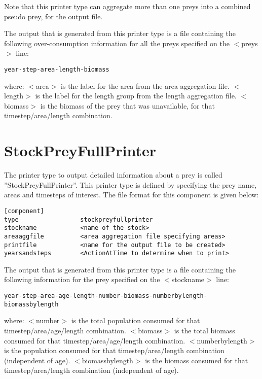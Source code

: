 \documentclass [a4paper, 10pt]{book}
\begin{document}
Note that this printer type can aggregate more than one preys into a combined pseudo prey, for the output file.

\bigskip
The output that is generated from this printer type is a file containing the following over-consumption information for all the preys specified on the $<$preys$>$ line:

{\small\begin{verbatim}
year-step-area-length-biomass
\end{verbatim}}

where:\newline
$<$area$>$ is the label for the area from the area aggregation file.\newline
$<$length$>$ is the label for the length group from the length aggregation file.\newline
$<$biomass$>$ is the biomass of the prey that was unavailable, for that timestep/area/length combination.

\section{StockPreyFullPrinter}\label{sec:stockpreyfullprinter}
The printer type to output detailed information about a prey is called ''StockPreyFullPrinter''.  This printer type is defined by specifying the prey name, areas and timesteps of interest.  The file format for this component is given below:

{\small\begin{verbatim}
[component]
type                 stockpreyfullprinter
stockname            <name of the stock>
areaaggfile          <area aggregation file specifying areas>
printfile            <name for the output file to be created>
yearsandsteps        <ActionAtTime to determine when to print>
\end{verbatim}}

The output that is generated from this printer type is a file containing the following information for the prey specified on the $<$stockname$>$ line:

{\small\begin{verbatim}
year-step-area-age-length-number-biomass-numberbylength-biomassbylength
\end{verbatim}}

where:\newline
$<$number$>$ is the total population consumed for that timestep/area/age/length combination.\newline
$<$biomass$>$ is the total biomass consumed for that timestep/area/age/length combination.\newline
$<$numberbylength$>$ is the population consumed for that timestep/area/length combination (independent of age).\newline
$<$biomassbylength$>$ is the biomass consumed for that timestep/area/length combination (independent of age).
\end{document}
